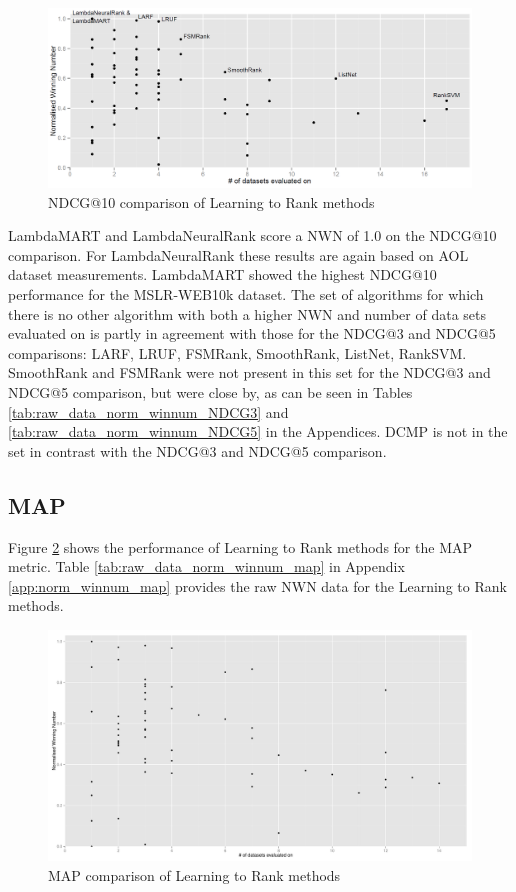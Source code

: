 \begin{figure}[!h]
\includegraphics[scale=0.285]{gfx/ndcg10_winnum}
\caption{\acs{NDCG}@10 comparison of Learning to Rank methods}
\label{fig:normalised_winning_number_NDCG10}
\end{figure}

LambdaMART and LambdaNeuralRank score a \ac{NWN} of 1.0 on the \ac{NDCG}@10 comparison. For LambdaNeuralRank these results are again based on AOL dataset measurements. LambdaMART showed the highest \ac{NDCG}@10 performance for the MSLR-WEB10k dataset. The set of algorithms for which there is no other algorithm with both a higher \ac{NWN} and number of data sets evaluated on is partly in agreement with those for the \ac{NDCG}@3 and \ac{NDCG}@5 comparisons: {LARF, LRUF, FSMRank, SmoothRank, ListNet, RankSVM}. SmoothRank and FSMRank were not present in this set for the \ac{NDCG}@3 and \ac{NDCG}@5 comparison, but were close by, as can be seen in Tables \ref{tab:raw_data_norm_winnum_NDCG3} and \ref{tab:raw_data_norm_winnum_NDCG5} in the Appendices. DCMP is not in the set in contrast with the \ac{NDCG}@3 and \ac{NDCG}@5 comparison.

\subsection{MAP}
Figure \ref{fig:normalised_winning_number_map} shows the performance of Learning to Rank methods for the \ac{MAP} metric. Table \ref{tab:raw_data_norm_winnum_map} in Appendix \ref{app:norm_winnum_map} provides the raw \ac{NWN} data for the Learning to Rank methods.\\

\begin{figure}[!h]
\includegraphics[scale=0.285]{gfx/map_winnum}
\caption{\acs{MAP} comparison of Learning to Rank methods}
\label{fig:normalised_winning_number_map}
\end{figure}

